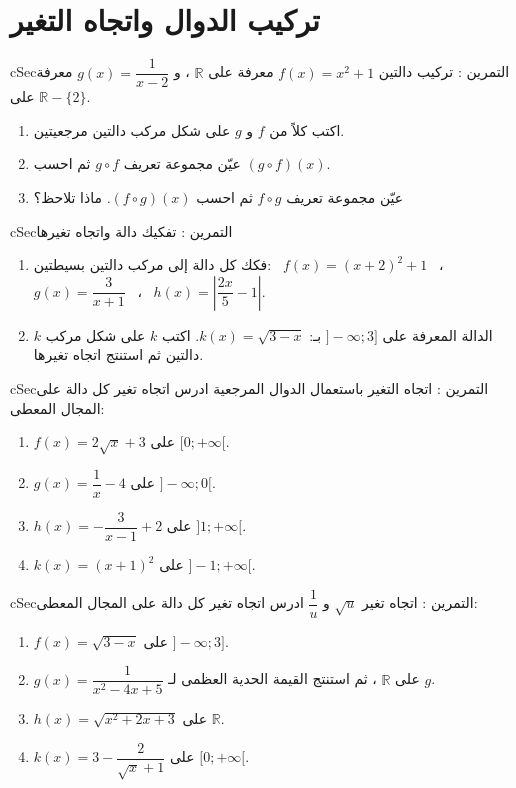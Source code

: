 \documentclass[12pt,a4paper]{article}
\newenvironment{BOX}[2]{\begin{otherlanguage}{english}\begin{arbox}{#1}{#2}}{\end{arbox}\end{otherlanguage}}
\newcounter{exo}
\newenvironment{tamrin}[1]{\stepcounter{exo}\begin{BOX}{cSec}{التمرين \theexo: #1}}{\end{BOX}}
\newcommand{\R}{\mathbb{R}}
\begin{document}
\section{تركيب الدوال واتجاه التغير}
\begin{tamrin}{تركيب دالتين}
$f(x)=x^2+1$ معرفة على $\R$ ، و $g(x)=\dfrac{1}{x-2}$ معرفة على $\R-\{2\}$.
\begin{enumerate}
\item اكتب كلاً من $f$ و $g$ على شكل مركب دالتين مرجعيتين.
\item عيّن مجموعة تعريف $g\circ f$ ثم احسب $(g\circ f)(x)$.
\item عيّن مجموعة تعريف $f\circ g$ ثم احسب $(f\circ g)(x)$. ماذا تلاحظ؟
\end{enumerate}
\end{tamrin}

\begin{tamrin}{تفكيك دالة واتجاه تغيرها}
\begin{enumerate}
\item فكك كل دالة إلى مركب دالتين بسيطتين: \ $f(x)=(x+2)^2+1$ \ ، \ $g(x)=\dfrac{3}{x+1}$ \ ، \ $h(x)=\left|\dfrac{2x}{5}-1\right|$.
\item $k$ الدالة المعرفة على $]-\infty;3]$ بـ: $k(x)=\sqrt{3-x}$. اكتب $k$ على شكل مركب دالتين ثم استنتج اتجاه تغيرها.
\end{enumerate}
\end{tamrin}

\begin{tamrin}{اتجاه التغير باستعمال الدوال المرجعية}
ادرس اتجاه تغير كل دالة على المجال المعطى:
\begin{enumerate}
\item $f(x)=2\sqrt x+3$ على $[0;+\infty[$.
\item $g(x)=\dfrac1x-4$ على $]-\infty;0[$.
\item $h(x)=-\dfrac{3}{x-1}+2$ على $]1;+\infty[$.
\item $k(x)=(x+1)^2$ على $]-1;+\infty[$.
\end{enumerate}
\end{tamrin}

\begin{tamrin}{اتجاه تغير $\sqrt u$ و $\dfrac1u$}
ادرس اتجاه تغير كل دالة على المجال المعطى:
\begin{enumerate}
\item $f(x)=\sqrt{3-x}$ على $]-\infty;3]$.
\item $g(x)=\dfrac{1}{x^2-4x+5}$ على $\R$ ، ثم استنتج القيمة الحدية العظمى لـ $g$.
\item $h(x)=\sqrt{x^2+2x+3}$ على $\R$.
\item $k(x)=3-\dfrac{2}{\sqrt x+1}$ على $[0;+\infty[$.
\end{enumerate}
\end{tamrin}
\end{document}
